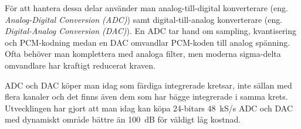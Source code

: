 För att hantera dessa delar använder man analog-till-digital konverterare
(eng. \emph{Analog-Digital Conversion (ADC)}) samt digital-till-analog
konverterare (eng. \emph{Digital-Analog Conversion (DAC)}).
En ADC tar hand om sampling, kvantisering och PCM-kodning medan en DAC
omvandlar PCM-koden till analog spänning.
Ofta behöver man komplettera med analoga filter, men moderna sigma-delta
omvandlare har kraftigt reducerat kraven.

ADC och DAC köper man idag som färdiga integrerade kretsar, inte sällan med
flera kanaler och det finns även dem som har bägge integrerade i samma krets.
Utvecklingen har gjort att man idag kan köpa 24-bitars 48~kS/s ADC och DAC med
dynamiskt område bättre än 100~dB för väldigt låg kostnad.
